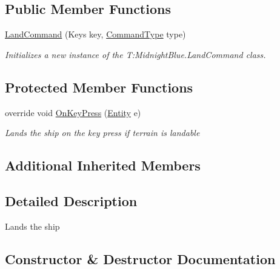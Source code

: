 \subsection*{Public Member Functions}
\begin{DoxyCompactItemize}
\item 
\hyperlink{class_midnight_blue_1_1_land_command_a936907822e22547099ec5267628fd457}{Land\+Command} (Keys key, \hyperlink{namespace_midnight_blue_1_1_engine_1_1_i_o_a8bc3f159399ecadd590f7df1b54354b0}{Command\+Type} type)
\begin{DoxyCompactList}\small\item\em Initializes a new instance of the T\+:\+Midnight\+Blue.\+Land\+Command class. \end{DoxyCompactList}\end{DoxyCompactItemize}
\subsection*{Protected Member Functions}
\begin{DoxyCompactItemize}
\item 
override void \hyperlink{class_midnight_blue_1_1_land_command_a2c496d96aed4498bb3ca133fcea4b172}{On\+Key\+Press} (\hyperlink{class_midnight_blue_1_1_engine_1_1_entity_component_1_1_entity}{Entity} e)
\begin{DoxyCompactList}\small\item\em Lands the ship on the key press if terrain is landable \end{DoxyCompactList}\end{DoxyCompactItemize}
\subsection*{Additional Inherited Members}


\subsection{Detailed Description}
Lands the ship 



\subsection{Constructor \& Destructor Documentation}
\hypertarget{class_midnight_blue_1_1_land_command_a936907822e22547099ec5267628fd457}{}\label{class_midnight_blue_1_1_land_command_a936907822e22547099ec5267628fd457} 
